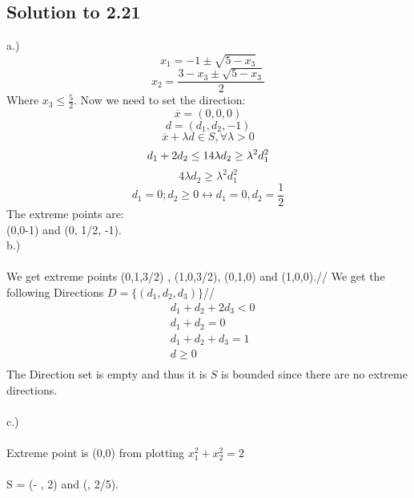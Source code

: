 \documentclass[12pt]{article}
\begin{document}
\subsection{Solution to 2.21}
a.) \\
\begin{equation*}
    x_1 = -1 \pm \sqrt{5-x_3}
\end{equation*}
\begin{equation*}
    x_2 = \frac{3-x_3 \pm \sqrt{5-x_3}}{2}
\end{equation*}
Where $x_3 \leq \frac{5}{2}$. 
Now we need to set the direction:\\
\begin{equation*}
    \overline{x} = (0,0,0)
\end{equation*}
\begin{equation*}
    d= (d_1,d_2,-1)
\end{equation*}
\begin{equation*}
    \overline{x} + \lambda d \in S, \forall \lambda > 0
\end{equation*}
\begin{equation*}
    d_1 + 2d_2 \leq 1 \\ 
    4\lambda d_2 \geq \lambda^2 d_1^2
\end{equation*}
\begin{equation*}
    4\lambda d_2 \geq \lambda^2 d_1^2
\end{equation*}
\begin{equation*}
    d_1 = 0 ; d_2 \geq 0 \leftrightarrow d_1 = 0 , d_2 = \frac{1}{2}
\end{equation*}
The extreme points are:\\
(0,0-1) and (0, 1/2, -1).\\

b.) \\ \\
We get extreme points (0,1,3/2) , (1,0,3/2), (0,1,0) and (1,0,0).//
We get the following Directions $D = \{ (d_1, d_2, d_3)\}$//
\begin{align*}
    &d_1 + d_2 + 2d_3 < 0\\
    &d_1 + d_2 = 0 \\
    &d_1 + d_2 + d_3  = 1\\
    &d \geq 0\\
\end{align*}
The Direction set is empty and thus it is $S$ is bounded since there are no extreme directions. \\ \\
c.) \\ \\ 
Extreme point is (0,0) from plotting $x_1^2 + x_2^2 = 2$\\ \\
\partial S = (- , 2) and (, 2/5).\\ \\
\\
\end{document}
